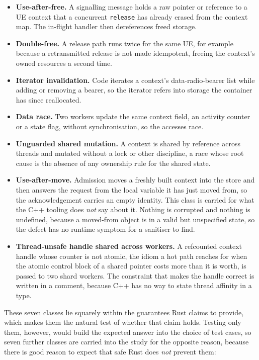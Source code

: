 \documentclass[english,oneside,a4paper,censored,csm,software-track-2020]{HYthesisML}
\begin{document}
\begin{itemize}
  \item \textbf{Use-after-free.} A signalling message holds a raw pointer or reference to a UE
        context that a concurrent \texttt{release} has already erased from the context map. The
        in-flight handler then dereferences freed storage.
  \item \textbf{Double-free.} A release path runs twice for the same UE, for example because a
        retransmitted release is not made idempotent, freeing the context's owned resources a
        second time.
  \item \textbf{Iterator invalidation.} Code iterates a context's data-radio-bearer list while
        adding or removing a bearer, so the iterator refers into storage the container has since
        reallocated.
  \item \textbf{Data race.} Two workers update the same context field, an activity counter or a
        state flag, without synchronisation, so the accesses race.
  \item \textbf{Unguarded shared mutation.} A context is shared by reference across threads and
        mutated without a lock or other discipline, a race whose root cause is the absence of any
        ownership rule for the shared state.
  \item \textbf{Use-after-move.} Admission moves a freshly built context into the store and
        then answers the request from the local variable it has just moved from, so the
        acknowledgement carries an empty identity. This class is carried for what the C++
        tooling does \emph{not} say about it. Nothing is corrupted and nothing is undefined,
        because a moved-from object is in a valid but unspecified state, so the defect has no
        runtime symptom for a sanitiser to find.
  \item \textbf{Thread-unsafe handle shared across workers.} A refcounted context handle whose
        counter is not atomic, the idiom a hot path reaches for when the atomic control block of
        a shared pointer costs more than it is worth, is passed to two shard workers. The
        constraint that makes the handle correct is written in a comment, because C++ has no way
        to state thread affinity in a type.
\end{itemize}

These seven classes lie squarely within the guarantees Rust claims to provide, which makes them
the natural test of whether that claim holds. Testing only them, however, would build the
expected answer into the choice of test cases, so seven further classes are carried into the
study for the opposite reason, because there is good reason to expect that safe Rust does
\emph{not} prevent them:
\end{document}
